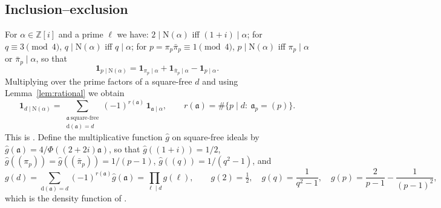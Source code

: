 \documentclass[11pt]{amsart}
\theoremstyle{remark}
\newcommand{\Z}{\mathbb{Z}}
\newcommand{\N}{\mathrm{N}}
\newcommand{\fa}{\mathfrak{a}}
\newcommand{\dd}{\mathrm{d}}
\begin{document}
\subsection{Inclusion--exclusion}
For $\alpha\in\Z[i]$ and a prime $\ell$ we have: $2\mid\N(\alpha)$ iff $(1+i)\mid\alpha$; for $q\equiv 3\pmod 4$, $q\mid\N(\alpha)$ iff $q\mid\alpha$; for $p=\pi_p\bar\pi_p\equiv 1\pmod 4$, $p\mid\N(\alpha)$ iff $\pi_p\mid\alpha$ or $\bar\pi_p\mid\alpha$, so that
\[
\mathbf 1_{p\mid\N(\alpha)}=\mathbf 1_{\pi_p\mid\alpha}+\mathbf 1_{\bar\pi_p\mid\alpha}-\mathbf 1_{p\mid\alpha}.
\]
Multiplying over the prime factors of a square-free $d$ and using Lemma~\ref{lem:rational} we obtain
\begin{equation}\label{eq:ie}
\mathbf 1_{d\mid\N(\alpha)}=\sum_{\substack{\fa\ \mathrm{square\text{-}free}\\ \dd(\fa)=d}}(-1)^{r(\fa)}\,\mathbf 1_{\fa\mid\alpha},\qquad r(\fa)=\#\{p\mid d:\ \fa_p=(p)\}.
\end{equation}
This is \cite[Lemma~3.1 and (3.12)]{Xie}. Define the multiplicative function $\hat g$ on square-free ideals by $\hat g(\fa)=4/\Phi((2+2i)\fa)$, so that $\hat g((1+i))=1/2$, $\hat g((\pi_p))=\hat g((\bar\pi_p))=1/(p-1)$, $\hat g((q))=1/(q^2-1)$, and
\begin{equation}\label{eq:g}
g(d)=\sum_{\dd(\fa)=d}(-1)^{r(\fa)}\hat g(\fa)=\prod_{\ell\mid d}g(\ell),\qquad g(2)=\tfrac12,\quad g(q)=\frac{1}{q^2-1},\quad g(p)=\frac{2}{p-1}-\frac{1}{(p-1)^2},
\end{equation}
which is the density function of \cite[(3.7)]{IJU}.
\end{document}
